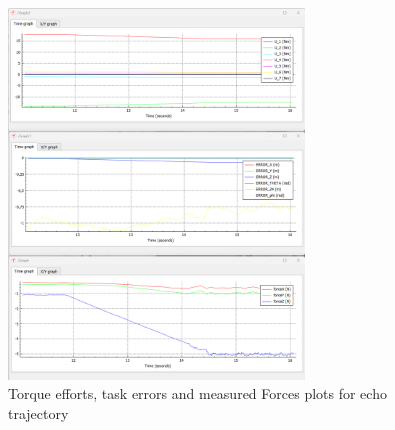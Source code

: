 \documentclass{article}
\begin{document}
\begin{figure}[H]
    \centering
    \includegraphics[width=0.7\textwidth]{echo_graphs.png}  
    \caption{Torque efforts, task errors and measured Forces plots for echo trajectory}
    \label{Echo}
\end{figure}
\end{document}
